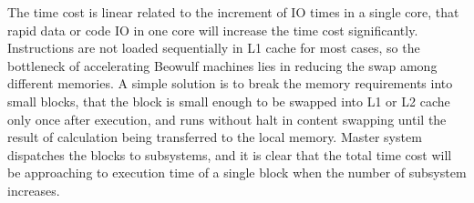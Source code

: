\documentclass[11pt,openright,a4paper]{report}
\begin{document}
The time cost is linear related to the increment of IO times in a single core, that rapid data or code IO in one core will increase the time cost significantly.
Instructions are not loaded sequentially in L1 cache for most cases, so the bottleneck of accelerating Beowulf machines lies in reducing the swap among different memories. A simple solution is to break the memory requirements into small blocks, that the block is small enough to be swapped into L1 or L2 cache only once after execution, and runs without halt in content swapping until the result of calculation being transferred to the local memory. Master system dispatches the blocks to subsystems, and it is clear that the total time cost will be approaching to execution time of a single block when the number of subsystem increases.\\
\end{document}
